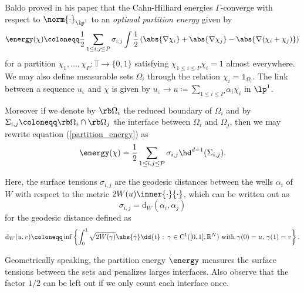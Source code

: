 Baldo proved in his paper \cite{baldo_minimal_interface_criterion} that the Cahn-Hilliard energies $ \Gamma $-converge with respect to $ \norm{ \cdot }_{\lp^{ 1 }} $ to an \emph{optimal partition energy} given by
\begin{equation}
	\label{partition_energy}
	\energy ( \chi ) 
	\coloneqq
	\frac{ 1 }{ 2 }
	\sum_{ 1 \leq i, j \leq P }
	\sigma_{ i , j }
	\int
	\frac{ 1 }{ 2 }
	\left(
	\abs{ \nabla \chi_{ i } }
	+
	\abs{ \nabla \chi_{ j } }
	-
	\abs{ \nabla ( \chi_{ i } + \chi_{ j } ) }
	\right)
\end{equation}
for a partition $ \chi_{ 1 }, \dotsc, \chi_{ P } \colon \mathbb{ T } \to \{ 0, 1 \} $ satisfying $ \chi_{ 1 \leq i \leq P } \chi_{ i } = 1 $ almost everywhere. We may also define measurable sets $ \Omega_{ i } $ through the relation $ \chi_{ i } = \mathds{1}_{ \Omega_{ i } }  $. The link between a sequence $ u_{ \varepsilon} $ and $ \chi $ is given by $ u_{ \varepsilon} \to u \coloneqq \sum_{ 1 \leq i \leq P } \alpha_{ i } \chi_{ i } $ in $ \lp^{ 1 } $. 

Moreover if we denote by $ \rb \Omega_{ i } $ the reduced boundary of $ \Omega_{ i } $ and by $ \Sigma_{ i , j } \coloneqq \rb \Omega_{ i } \cap \rb \Omega_{ j } $ the interface between $ \Omega_{ i } $ and $ \Omega_{ j } $, then we may rewrite equation (\ref{partition_energy}) as 
\begin{equation*}
	\energy ( \chi ) 
	=
	\frac{ 1 }{ 2 }
	\sum_{1 \leq i, j \leq P }
	\sigma_{ i , j } \hd^{ d - 1 } ( \Sigma_{ i , j } ).
\end{equation*}

Here, the surface tensions $ \sigma_{ i , j } $ are the geodesic distances between the wells $ \alpha_{ i } $ of $ W $ with respect to the metric $ 2W(u) \inner{\cdot}{\cdot} $, which can be written out as
\begin{equation*}
	\sigma_{ i , j } = \mathrm{ d }_{ W } ( \alpha_{ i } , \alpha_{ j } )
\end{equation*}
for the geodesic distance defined as
\begin{equation}
	\mathrm{ d }_{ W } ( u, v )
	\coloneqq
	\inf
	\left\{
	\int_{ 0 }^{ 1 }
	\sqrt{ 2 W ( \gamma ) }
	\abs{ \dot{ \gamma }  }
	\dd{t}
	\,
	\colon
	\, \gamma \in \mathrm{ C }^{ 1 }( [0, 1 ], \mathbb{ R }^{ N } ) \text{ with } \gamma( 0 ) = u,\, \gamma( 1 )= v 
	\right\}.
\end{equation}

Geometrically speaking, the partition energy $ \energy $ measures the surface tensions between the sets and penalizes larges interfaces. Also observe that the factor $ 1/2 $ can be left out if we only count each interface once.